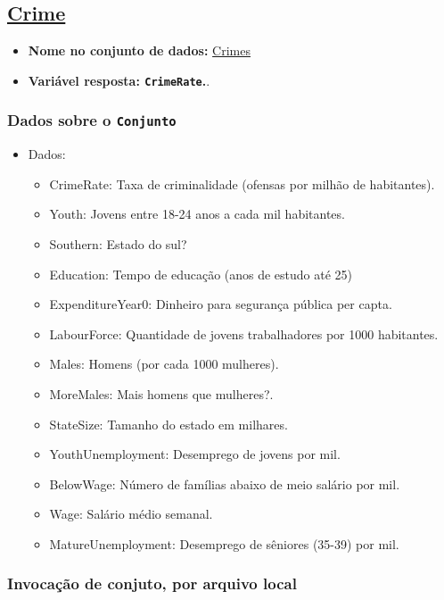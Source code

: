 \documentclass[12pt]{article}
\begin{document}
\subsection{\href{https://www.sheffield.ac.uk/mash/statistics/datasets}{Crime}}
\label{sec:orgbab30bb}
\begin{itemize}
\item \textbf{Nome no conjunto de dados:} \href{https://drive.google.com/file/d/1hZpHoEXbhZGvmtmrbcWpXYfBV-2ZD7uF/view?usp=sharing}{Crimes}
\item \textbf{Variável resposta: \texttt{CrimeRate}.}.
\end{itemize}
\subsubsection{Dados sobre o \texttt{Conjunto}}
\label{sec:orgb5f5338}
\begin{itemize}
\item Dados:
\begin{itemize}
\item CrimeRate: Taxa de criminalidade (ofensas por milhão de habitantes).
\item Youth: Jovens entre 18-24 anos a cada mil habitantes.
\item Southern: Estado do sul?
\item Education: Tempo de educação (anos de estudo até 25)
\item ExpenditureYear0: Dinheiro para segurança pública per capta.
\item LabourForce: Quantidade de jovens trabalhadores por 1000 habitantes.
\item Males: Homens (por cada 1000 mulheres).
\item MoreMales: Mais homens que mulheres?.
\item StateSize: Tamanho do estado em milhares.
\item YouthUnemployment: Desemprego de jovens por mil.
\item BelowWage: Número de famílias abaixo de meio salário por mil.
\item Wage: Salário médio semanal.
\item MatureUnemployment: Desemprego de sêniores (35-39) por mil.
\end{itemize}
\end{itemize}

\subsubsection{Invocação de conjuto, por arquivo local}
\label{sec:org698e03f}
\end{document}
